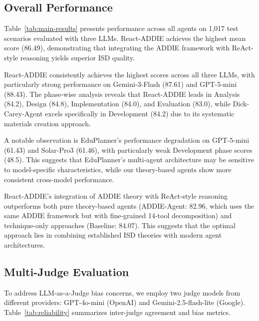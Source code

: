 \subsection{Overall Performance}
\label{subsec:overall-performance}

Table~\ref{tab:main-results} presents performance across all agents on 1,017 test scenarios evaluated with three LLMs. React-ADDIE achieves the highest mean score (86.49), demonstrating that integrating the ADDIE framework with ReAct-style reasoning yields superior ISD quality.

React-ADDIE consistently achieves the highest scores across all three LLMs, with particularly strong performance on Gemini-3-Flash (87.61) and GPT-5-mini (88.43). The phase-wise analysis reveals that React-ADDIE leads in Analysis (84.2), Design (84.8), Implementation (84.0), and Evaluation (83.0), while Dick-Carey-Agent excels specifically in Development (84.2) due to its systematic materials creation approach.

A notable observation is EduPlanner's performance degradation on GPT-5-mini (61.43) and Solar-Pro3 (61.46), with particularly weak Development phase scores (48.5). This suggests that EduPlanner's multi-agent architecture may be sensitive to model-specific characteristics, while our theory-based agents show more consistent cross-model performance.

React-ADDIE's integration of ADDIE theory with ReAct-style reasoning outperforms both pure theory-based agents (ADDIE-Agent: 82.96, which uses the same ADDIE framework but with fine-grained 14-tool decomposition) and technique-only approaches (Baseline: 84.07). This suggests that the optimal approach lies in combining established ISD theories with modern agent architectures.

\subsection{Multi-Judge Evaluation}
\label{subsec:multi-judge}

To address LLM-as-a-Judge bias concerns, we employ two judge models from different providers: GPT-4o-mini (OpenAI) and Gemini-2.5-flash-lite (Google). Table~\ref{tab:reliability} summarizes inter-judge agreement and bias metrics.

